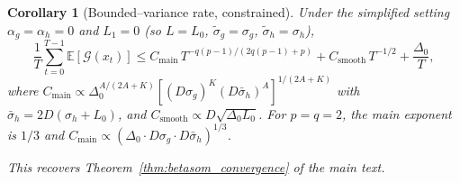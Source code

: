 \documentclass{article}
\theoremstyle{plain}
\newtheorem{corollary}[theorem]{Corollary}
\theoremstyle{definition}
\theoremstyle{remark}
\begin{document}
\begin{corollary}[Bounded--variance rate, constrained]
\label{cor:app:conv-b-simple}
Under the simplified setting $\alpha_g = \alpha_h = 0$ and $L_1 = 0$
(so $L = L_0$, $\tilde\sigma_g = \sigma_g$, $\tilde\sigma_h = \sigma_h$),
\begin{equation}
  \frac1T\sum_{t=0}^{T-1}\mathbb{E}[\mathcal{G}(x_t)]
  \leq C_{\mathrm{main}}\, T^{-q(p-1)/(2q(p-1)+p)}
    + C_{\mathrm{smooth}}\, T^{-1/2}
    + \frac{\Delta_0}{T},
  \label{eq:app:conv-b-simple}
\end{equation}
where $C_{\mathrm{main}} \propto \Delta_0^{A/(2A+K)}[(D\sigma_g)^K
(D\bar\sigma_h)^A]^{1/(2A+K)}$ with $\bar\sigma_h = 2D(\sigma_h + L_0)$,
and $C_{\mathrm{smooth}} \propto D\sqrt{\Delta_0 L_0}$. For $p = q = 2$,
the main exponent is $1/3$ and $C_{\mathrm{main}} \propto (\Delta_0
\cdot D\sigma_g\cdot D\bar\sigma_h)^{1/3}$.

This recovers Theorem~\ref{thm:betasom_convergence} of the main text.
\end{corollary}
\end{document}
